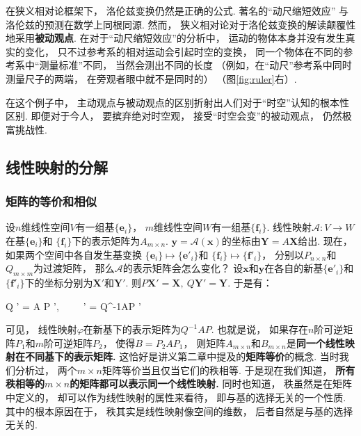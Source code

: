 在狭义相对论框架下，
洛伦兹变换仍然是正确的公式.
著名的“动尺缩短效应”
与洛伦兹的预测在数学上同根同源.
然而，
狭义相对论对于洛伦兹变换的解读颠覆性地采用\textbf{被动观点}.
在对于“动尺缩短效应”的分析中，
运动的物体本身并没有发生真实的变化，
只不过参考系的相对运动会引起时空的变换，
同一个物体在不同的参考系中“测量标准”不同，
当然会测出不同的长度
（例如，在“动尺”参考系中同时测量尺子的两端，
在旁观者眼中就不是同时的）
（图\ref{fig:ruler}右）.

在这个例子中，
主动观点与被动观点的区别折射出人们对于“时空”认知的根本性区别.
即便对于今人，
要摈弃绝对时空观，
接受“时空会变”的被动观点，
仍然极富挑战性.

\subsection{线性映射的分解}

\subsubsection{矩阵的等价和相似}

设$n$维线性空间$V$有一组基$\{ \bm{e}_i \}$，
$m$维线性空间$W$有一组基$\{ \bm{f}_i \}$.
线性映射$\mathcal{A}: V \to W$在基$\{ \bm{e}_i \}$和
$\{ \bm{f}_i \}$下的表示矩阵为$A_{m \times n}$.
$\bm{y} = \mathcal{A} (\bm{x})$的坐标由$\bm{Y} = A \bm{X}$给出.
现在，
如果两个空间中各自发生基变换
$\{ \bm{e}_i \} \mapsto \{ \bm{e}'_i \}$和
$\{ \bm{f}_i \} \mapsto \{ \bm{f}'_i \}$，
分别以$P_{n \times n}$和$Q_{m \times m}$为过渡矩阵，
那么$\mathcal{A}$的表示矩阵会怎么变化？
设$\bm{x}$和$\bm{y}$在各自的新基$\{ \bm{e}'_i \}$和$\{ \bm{f}'_i \}$下的坐标分别为$\bm{X}'$和$\bm{Y}'$.
则$P\bm{X}' = \bm{X}, ~Q\bm{Y}' = \bm{Y}$.
于是有：
\begin{eq1}
    Q ' = A P ', ~~
    ~  ' = Q^{-1}AP '
\end{eq1}

可见，
线性映射$\varphi$在新基下的表示矩阵为$Q^{-1}AP$.
也就是说，
如果存在$n$阶可逆矩阵$P_1$和$m$阶可逆矩阵$P_2$，
使得$B = P_2 A P_1$，
则矩阵$A_{m \times n}$和$B_{m \times n}$是\textbf{同一个线性映射在不同基下的表示矩阵.}
这恰好是讲义第二章中提及的\textbf{矩阵等价}的概念.
当时我们分析过，
两个$m \times n$矩阵等价当且仅当它们的秩相等.
于是现在我们知道，
\textbf{所有秩相等的$m \times n$的矩阵都可以表示同一个线性映射.}
同时也知道，
秩虽然是在矩阵中定义的，
却可以作为线性映射的属性来看待，
即与基的选择无关的一个性质.
其中的根本原因在于，
秩其实是线性映射像空间的维数，
后者自然是与基的选择无关的.

